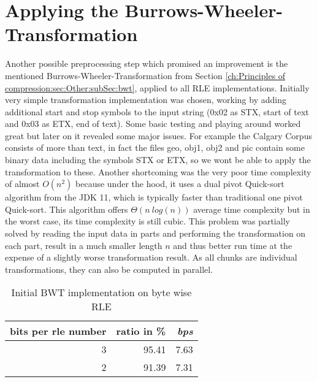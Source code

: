 \section{Applying the Burrows-Wheeler-Transformation}
\par{
Another possible preprocessing step which promised an improvement is the mentioned Burrows-Wheeler-Transformation from Section \ref{ch:Principles of compression:sec:Other:subSec:bwt}, applied to all RLE implementations. Initially very simple transformation implementation was chosen, working by adding additional start and stop symbols to the input string (0x02 as STX, start of text and 0x03 as ETX, end of text). Some basic testing and playing around worked great but later on it revealed some major issues. For example the Calgary Corpus consists of more than text, in fact the files geo, obj1, obj2 and pic contain some binary data including the symbols STX or ETX, so we wont be able to apply the transformation to these. Another shortcoming was the very poor time complexity of almost $O (n^2)$ because under the hood, it uses a dual pivot Quick-sort algorithm from the JDK 11, which is typically faster than traditional one pivot Quick-sort. This algorithm offers $\Theta (n \: log(n))$ average time complexity but in the worst case, its time complexity is still cubic. This problem was partially solved by reading the input data in parts and performing the transformation on each part, result in a much smaller length $n$ and thus better run time at the expense of a slightly worse transformation result. As all chunks are individual transformations, they can also be computed in parallel.

\begin{table}[h]
	\centering
	\begin{tabular}{r|r|r}	
		bits per rle number & ratio in \% & \textit{bps}\\
		\hline
		3 & 95.41 & 7.63\\
		2 & 91.39 & 7.31 \\
	\end{tabular}
	\caption{Initial BWT implementation on byte wise RLE}
	\label{tab:t11 Simple Burrows Wheeler Transformation on byte wise RLE}
\end{table}
}
